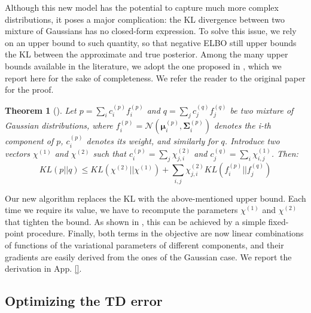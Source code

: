 \documentclass{article}
\newtheorem{theorem}{Theorem}
\begin{document}
Although this new model has the potential to capture much more complex distributions, it poses a major complication: the KL divergence between two mixture of Gaussians has no closed-form expression. To solve this issue, we rely on an upper bound to such quantity, so that negative ELBO still upper bounds the KL between the approximate and true posterior. Among the many upper bounds available in the literature, we adopt the one proposed in \cite{hershey2007approximating}, which we report here for the sake of completeness. We refer the reader to the original paper for the proof.
\begin{theorem}[\cite{hershey2007approximating}]\label{th:ukl}
Let $p = \sum_{i} c_i^{(p)} f_i^{(p)}$ and $q = \sum_{j} c_j^{(q)} f_j^{(q)}$ be two mixture of Gaussian distributions, where $f_i^{(p)} = \mathcal{N}(\bm{\mu}_i^{(p)},\bm{\Sigma}_i^{(p)})$ denotes the i-th component of $p$, $c_i^{(p)}$ denotes its weight, and similarly for $q$. Introduce two vectors $\chi^{(1)}$ and $\chi^{(2)}$ such that $c_i^{(p)} = \sum_j \chi^{(2)}_{j,i}$ and $c_j^{(q)} = \sum_i \chi^{(1)}_{i,j}$. Then:
\begin{equation}
KL(p||q) \leq KL(\chi^{(2)}||\chi^{(1)}) + \sum_{i,j} \chi^{(2)}_{j,i}KL(f_i^{(p)}||f_j^{(q)})
\end{equation}
\end{theorem}
Our new algorithm replaces the KL with the above-mentioned upper bound. Each time we require its value, we have to recompute the parameters $\chi^{(1)}$ and $\chi^{(2)}$ that tighten the bound. As shown in \cite{hershey2007approximating}, this can be achieved by a simple fixed-point procedure. Finally, both terms in the objective are now linear combinations of functions of the variational parameters of different components, and their gradients are easily derived from the ones of the Gaussian case. We report the derivation in App. \ref{}.

\subsection{Optimizing the TD error} \label{sec:td}
\end{document}
